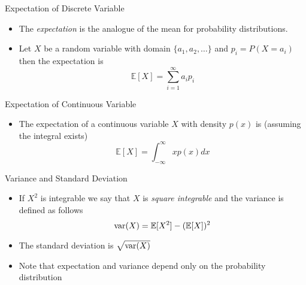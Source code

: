 \documentclass{beamer}
\begin{document}
\begin{frame}{Expectation of Discrete Variable} 
\begin{itemize} 
 \item The \emph{expectation} is the analogue of the mean for probability distributions.
 \item Let $X$ be a random variable with domain $\{a_1, a_2, \ldots \}$ and $p_i = P(X = a_i)$ then the expectation is 
 \begin{displaymath} 
  \mathbb{E}[X] = \sum_{i=1}^\infty a_i p_i
 \end{displaymath}
\end{itemize}
\end{frame}

\begin{frame}{Expectation of Continuous Variable} 
\begin{itemize} 
 \item The expectation of a continuous variable $X$ with density $p(x)$ is (assuming the integral exists) 
 \begin{displaymath} 
  \mathbb{E}[X] = \int_{-\infty}^\infty x p(x) dx
 \end{displaymath}
\end{itemize}
\end{frame}

\begin{frame}{Variance and Standard Deviation} 
\begin{itemize} 
 \item If $X^2$ is integrable we say that $X$ is \emph{square integrable} and the variance is defined as follows 
 \begin{displaymath} 
 \mbox{var}(X) = \mathbb{E}[X^2] - (\mathbb{E}[X])^2  
 \end{displaymath}
 \item The standard deviation is $\sqrt{\mbox{var}(X)}$
 \item Note that expectation and variance depend only on the probability distribution 
\end{itemize}
\end{frame}
\end{document}
